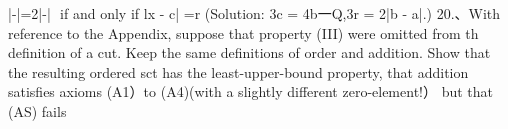 |-|=2|-| $$ if and only if lx - c| =r (Solution: 3c = 4b一Q,3r = 2|b - a|.) 20.、With reference to the Appendix, suppose that property (III) were omitted from th definition of a cut. Keep the same definitions of order and addition. Show that the resulting ordered sct has the least-upper-bound property, that addition satisfies axioms (A1）to (A4)(with a slightly different zero-element!） but that (AS) fails